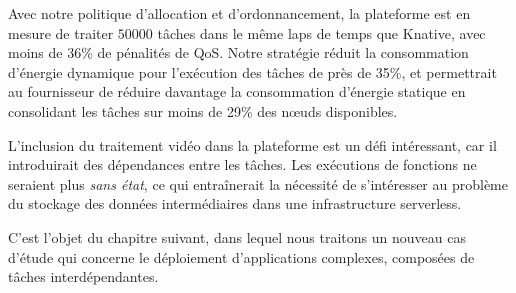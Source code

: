 Avec notre politique d'allocation et d'ordonnancement, la plateforme est en mesure de traiter $50 000$ tâches dans le même laps de temps que Knative, avec moins de 36\% de pénalités de QoS. Notre stratégie réduit la consommation d'énergie dynamique pour l'exécution des tâches de près de 35\%, et permettrait au fournisseur de réduire davantage la consommation d'énergie statique en consolidant les tâches sur moins de 29\% des nœuds disponibles.

L'inclusion du traitement vidéo dans la plateforme est un défi intéressant, car il introduirait des dépendances entre les tâches. Les exécutions de fonctions ne seraient plus \textit{sans état}, ce qui entraînerait la nécessité de s'intéresser au problème du stockage des données intermédiaires dans une infrastructure serverless.

C'est l'objet du chapitre suivant, dans lequel nous traitons un nouveau cas d'étude qui concerne le déploiement d'applications complexes, composées de tâches interdépendantes.

